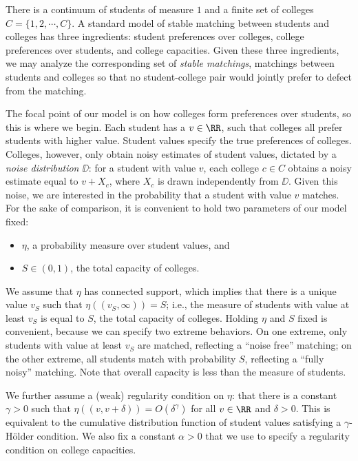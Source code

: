\documentclass[10pt]{article}
\begin{document}
\begin{ReviewVerbatim}
There is a continuum of students of measure $1$ and a finite set of colleges $C = \{1, 2, \cdots, C\}$. A standard model of stable matching between students and colleges has three ingredients: student preferences over colleges, college preferences over students, and college capacities. Given these three ingredients, we may analyze the corresponding set of \textit{stable matchings}, matchings between students and colleges so that no student-college pair would jointly prefer to defect from the matching.

The focal point of our model is on how colleges form preferences over students, so this is where we begin. Each student has a  $v\in \RR$, such that colleges all prefer students with higher value. Student values specify the true preferences of colleges. Colleges, however, only obtain noisy estimates of student values, dictated by a \textit{noise distribution} $\DD$: for a student with value $v$, each college $c\in C$ obtains a noisy estimate equal to $v + X_c$, where $X_c$ is drawn independently from $\DD$. Given this noise, we are interested in the probability that a student with value $v$ matches. For the sake of comparison, it is convenient to hold two parameters of our model fixed:
\begin{itemize}
    \item $\eta$, a probability measure over student values, and
    \item $S\in (0,1)$, the total capacity of colleges.
\end{itemize}
We assume that $\eta$ has connected support, which implies that there is a unique value $v_S$ such that $\eta((v_S, \infty))=S$; i.e., the measure of students with value at least $v_S$ is equal to $S$, the total capacity of colleges. Holding $\eta$ and $S$ fixed is convenient, because we can specify two extreme behaviors. On one extreme, only students with value at least $v_S$ are matched, reflecting a ``noise free'' matching; on the other extreme, all students match with probability $S$, reflecting a ``fully noisy'' matching. Note that overall capacity is less than the measure of students.

We further assume a (weak) regularity condition on $\eta$: that there is a constant $\gamma>0$ such that $\eta((v, v+\delta)) = O(\delta^\gamma)$ for all $v\in \RR$ and $\delta > 0.$ This is equivalent to the cumulative distribution function of student values satisfying a $\gamma$-Hölder condition. We also fix a constant $\alpha>0$ that we use to specify a regularity condition on college capacities.
\end{ReviewVerbatim}
\end{document}
